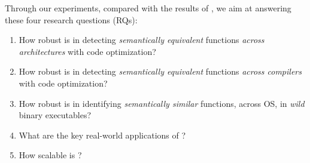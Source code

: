 
Through our experiments, compared with the results of \tool, we aim at answering these four research questions (RQs):
\begin{enumerate}[label=\textbf{RQ\arabic*.},itemindent=*,itemsep=0.15mm]
\item  How robust is \toolNew in detecting \emph{semantically equivalent} functions \emph{across architectures} with code optimization?

\item  How robust is \toolNew in detecting \emph{semantically equivalent} functions \emph{across compilers} with code optimization?
\item  How robust is \toolNew in identifying \emph{semantically similar} functions, across OS, in \emph{wild} binary executables?
\item  What are the key real-world applications of \toolNew?
\item  How scalable is \toolNew?
\end{enumerate}

